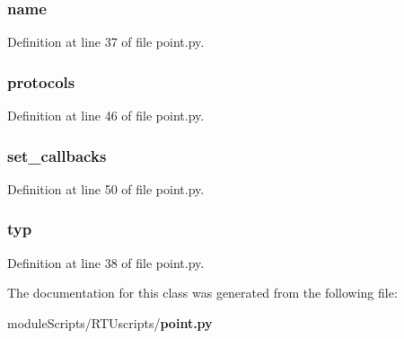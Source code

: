 \subsubsection[{name}]{\setlength{\rightskip}{0pt plus 5cm}name}\label{classpoint_1_1_point_ab74e6bf80237ddc4109968cedc58c151}


Definition at line 37 of file point.\+py.

\subsubsection[{protocols}]{\setlength{\rightskip}{0pt plus 5cm}protocols}\label{classpoint_1_1_point_afd636896b1f6e43aacdb4c31b5da5036}


Definition at line 46 of file point.\+py.

\subsubsection[{set\+\_\+callbacks}]{\setlength{\rightskip}{0pt plus 5cm}set\+\_\+callbacks}\label{classpoint_1_1_point_a27d22c720ac8eedb7322cbbdde7233f2}


Definition at line 50 of file point.\+py.

\subsubsection[{typ}]{\setlength{\rightskip}{0pt plus 5cm}typ}\label{classpoint_1_1_point_a5574a1c4b4703a8658c3463fdbde74f3}


Definition at line 38 of file point.\+py.



The documentation for this class was generated from the following file\+:\begin{DoxyCompactItemize}
\item 
module\+Scripts/\+R\+T\+Uscripts/{\bf point.\+py}\end{DoxyCompactItemize}
